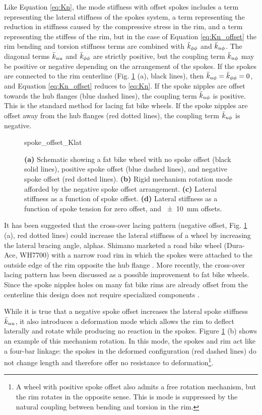 \documentclass[\rootdir/thesis.tex]{subfiles}
\begin{document}
Like Equation \eqref{eq:Kn}, the mode stiffness with offset spokes includes a term representing the lateral stiffness of the spokes system, a term representing the reduction in stiffness caused by the compressive stress in the rim, and a term representing the stiffess of the rim, but in the case of Equation \eqref{eq:Kn_offset} the rim bending and torsion stiffness terms are combined with $\bar{k}_{\phi\phi}$ and $\bar{k}_{u\phi}$. The diagonal terms $\bar{k}_{uu}$ and $\bar{k}_{\phi\phi}$ are strictly positive, but the coupling term $\bar{k}_{u\phi}$ may be positive or negative depending on the arrangement of the spokes. If the spokes are connected to the rim centerline (Fig. \ref{fig:spoke_offset} (a), black lines), then $\bar{k}_{u\phi}=\bar{k}_{\phi\phi}=0$, and Equation \eqref{eq:Kn_offset} reduces to \eqref{eq:Kn}. If the spoke nipples are offset towards the hub flanges (blue dashed lines), the coupling term $\bar{k}_{u\phi}$ is positive. This is the standard method for lacing fat bike wheels. If the spoke nipples are offset away from the hub flanges (red dotted lines), the coupling term $\bar{k}_{u\phi}$ is negative.

\begin{figure}[t]
\centering
{spoke_offset_Klat}
\caption{\textbf{(a)} Schematic showing a fat bike wheel with no spoke offset (black solid lines), positive spoke offset (blue dashed lines), and negative spoke offset (red dotted lines). \textbf{(b)} Rigid mechanism rotation mode afforded by the negative spoke offset arrangement. \textbf{(c)} Lateral stiffness as a function of spoke offset. \textbf{(d)} Lateral stiffness as a function of spoke tension for zero offset, and \SI{+-10}{mm} offsets.}
\label{fig:spoke_offset}
\end{figure}

It has been suggested that the cross-over lacing pattern (negative offset, Fig. \ref{fig:spoke_offset} (a), red dotted lines) could increase the lateral stiffness of a wheel by increasing the lateral bracing angle, \gls{alphas}. Shimano marketed a road bike wheel (Dura-Ace, WH7700) with a narrow road rim in which the spokes were attached to the outside edge of the rim opposite the hub flange \cite{Rinard}. More recently, the cross-over lacing pattern has been discussed as a possible improvement to fat bike wheels. Since the spoke nipples holes on many fat bike rims are already offset from the centerline this design does not require specialized components \cite{MTB forums}.

While it is true that a negative spoke offset increases the lateral spoke stiffness $\bar{k}_{uu}$, it also introduces a deformation mode which allows the rim to deflect laterally and rotate while producing no reaction in the spokes. Figure \ref{fig:spoke_offset} (b) shows an example of this mechanism rotation. In this mode, the spokes and rim act like a four-bar linkage: the spokes in the deformed configuration (red dashed lines) do not change length and therefore offer no resistance to deformation\footnote{A wheel with positive spoke offset also admits a free rotation mechanism, but the rim rotates in the opposite sense. This is mode is suppressed by the natural coupling between bending and torsion in the rim.}.
\end{document}
